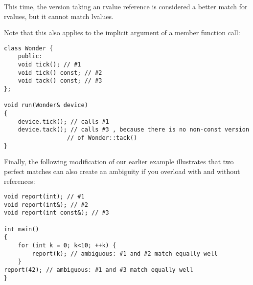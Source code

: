 This time, the version taking an rvalue reference is considered a better match for rvalues, but it cannot match lvalues.

Note that this also applies to the implicit argument of a member function call:

\begin{lstlisting}[style=styleCXX]
class Wonder {
	public:
	void tick(); // #1
	void tick() const; // #2
	void tack() const; // #3
};

void run(Wonder& device)
{
	device.tick(); // calls #1
	device.tack(); // calls #3 , because there is no non-const version
				  // of Wonder::tack()
}
\end{lstlisting}

Finally, the following modification of our earlier example illustrates that two perfect matches can also create an ambiguity if you overload with and without references:

\begin{lstlisting}[style=styleCXX]
void report(int); // #1
void report(int&); // #2
void report(int const&); // #3

int main()
{
	for (int k = 0; k<10; ++k) {
		report(k); // ambiguous: #1 and #2 match equally well
	}
report(42); // ambiguous: #1 and #3 match equally well
}
\end{lstlisting}








